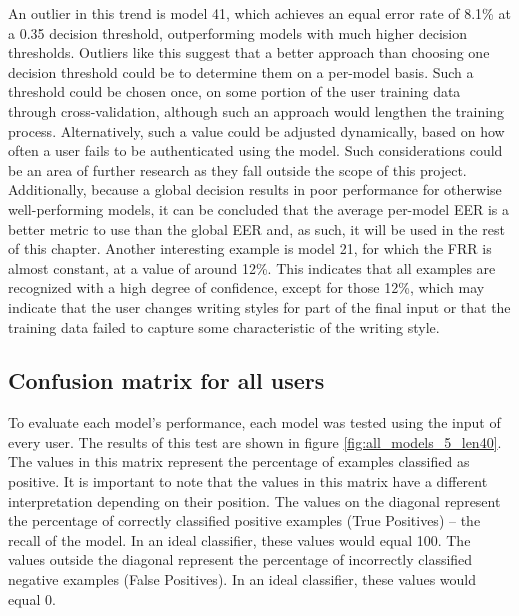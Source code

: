 An outlier in this trend is model 41, which achieves an equal error rate of 8.1\% at a 0.35 decision threshold, outperforming models with much higher decision thresholds. Outliers like this suggest that a better approach than choosing one decision threshold could be to determine them on a per-model basis. Such a threshold could be chosen once, on some portion of the user training data through cross-validation, although such an approach would lengthen the training process. Alternatively, such a value could be adjusted dynamically, based on how often a user fails to be authenticated using the model. Such considerations could be an area of further research as they fall outside the scope of this project.
Additionally, because a global decision results in poor performance for otherwise well-performing models, it can be concluded that the average per-model EER is a better metric to use than the global EER and, as such, it will be used in the rest of this chapter.
Another interesting example is model 21, for which the FRR is almost constant, at a value of around 12\%. This indicates that all examples are recognized with a high degree of confidence, except for those 12\%, which may indicate that the user changes writing styles for part of the final input or that the training data failed to capture some characteristic of the writing style.

\subsection{Confusion matrix for all users}
To evaluate each model's performance, each model was tested using the input of every user. The results of this test are shown in figure \ref{fig:all_models_5_len40}. The values in this matrix represent the percentage of examples classified as positive. It is important to note that the values in this matrix have a different interpretation depending on their position. The values on the diagonal represent the percentage of correctly classified positive examples (True Positives) -- the recall of the model. In an ideal classifier, these values would equal 100. The values outside the diagonal represent the percentage of incorrectly classified negative examples (False Positives). In an ideal classifier, these values would equal 0.

